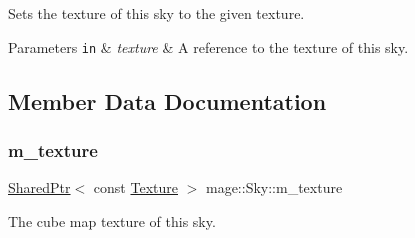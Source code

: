 Sets the texture of this sky to the given texture.


\begin{DoxyParams}[1]{Parameters}
\mbox{\tt in}  & {\em texture} & A reference to the texture of this sky. \\
\hline
\end{DoxyParams}


\subsection{Member Data Documentation}
\hypertarget{classmage_1_1_sky_a4f9e8b3658134a04284174c419390a17}{}\label{classmage_1_1_sky_a4f9e8b3658134a04284174c419390a17} 
\subsubsection{\texorpdfstring{m\+\_\+texture}{m\_texture}}
{\footnotesize\ttfamily \hyperlink{namespacemage_a1e01ae66713838a7a67d30e44c67703e}{Shared\+Ptr}$<$ const \hyperlink{classmage_1_1_texture}{Texture} $>$ mage\+::\+Sky\+::m\+\_\+texture\hspace{0.3cm}{\ttfamily [private]}}

The cube map texture of this sky. 